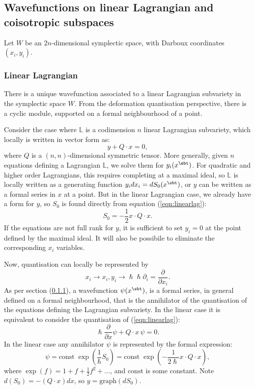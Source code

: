     

    
    \subsection{Wavefunctions on linear Lagrangian and coisotropic subspaces}
    
    Let \(W\) be an \(2n\)-dimensional symplectic space, with Darboux coordinates \((x_i,y_i)\).

    \subsubsection{Linear Lagrangian}
    
    There is a unique wavefunction associated to a linear Lagrangian subvariety in the symplectic space \(W\). From the deformation quantisation perspective, there is a cyclic module, supported on a formal neighbourhood of a point.
    
    Consider the case where \(\mathbb{L}\) is a codimension \(n\) linear Lagrangian subvariety, which locally is written in vector form as:
    \begin{equation}
        \label{eqn:linearlag}
        y + Q \cdot x = 0,
    \end{equation}
    where \(Q\) is a \((n,n)\)-dimensional symmetric tensor. More generally, given \(n\) equations defining a Lagrangian \( \mathbb{L}\), we solve them for \(y_i(x^{\sbt})\). For quadratic and higher order Lagrangians, this requires completing at a maximal ideal, so \( \mathbb{L}\) is locally written as a generating function \(y_i dx_i =  dS_0(x^{\sbt})\), or \(y\) can be written as a formal series in \(x\) at a point. But in the linear Lagrangian case, we already have a form for \(y\), so \(S_0\) is found directly from equation (\ref{eqn:linearlag}): 
    \[S_0 = -\frac{1}{2} x \cdot Q \cdot x. \]
    If the equations are not full rank for \(y\), it is sufficient to set \(y_i=0\) at the point defined by the maximal ideal. It will also be possibile to eliminate the corresponding \(x_i\) variables.
    
    Now, quantisation can locally be represented by 
    \[ x_i \rightarrow x_i, y_i \rightarrow \hslash \hslash \partial_i = \frac{\partial}{\partial x_i}.\]
    As per section (\ref{}), a wavefunction \( \psi(x^{\sbt})\), is a formal series, in general defined on a formal neighbourhood, that is the annihilator of the quantisation of the equations defining the Lagrangian subvariety. In the linear case it is equivalent to consider the quantisation of (\ref{eqn:linearlag}):
    \[ \hslash \frac{\partial}{\partial x} \psi + Q \cdot x\, \psi = 0. \]
    In the linear case any annihilator \( \psi\) is represented by the formal expression:
    \[ \psi = \mathrm{const} \; \exp \left( \frac{1}{\hslash} S_0 \right) = \mathrm{const} \; \exp \left( -\frac{1}{2\hslash} x \cdot Q \cdot x \right), \]
    where \(\exp(f) = 1 + f + \frac{1}{2} f^2 + \dots \), and \( \mathrm{const}\) is some constant. Note \(  d (S_0 ) = -(Q \cdot x) dx\), so \( y=\mathrm{graph}(dS_0)\). 
    
